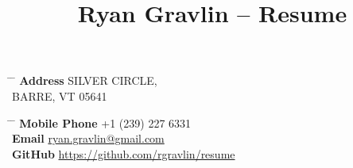 \documentclass[10pt]{article} %
\begin{document}
\title{Ryan Gravlin -- Resume} %
\parbox{0.5\textwidth}{ %
\begin{tabbing} %
\hspace{3cm} \= \hspace{4cm} \= \kill %
{\bf Address}  SILVER CIRCLE,\\ %
\> BARRE, VT 05641 \\ %
\end{tabbing}}
\hfill %
\parbox{0.5\textwidth}{ %
\begin{tabbing} %
\hspace{3cm} \= \hspace{4cm} \= \kill %
{\bf Mobile Phone} \> +1 (239) 227 6331 \\ %
{\bf Email} \> \href{mailto:ryan.gravlin@gmail.com}{ryan.gravlin@gmail.com} \\ %
{\bf GitHub} \> \href{https://github.com/rgravlin/resume}{https://github.com/rgravlin/resume} \\ %
\end{tabbing}}
\end{document}
